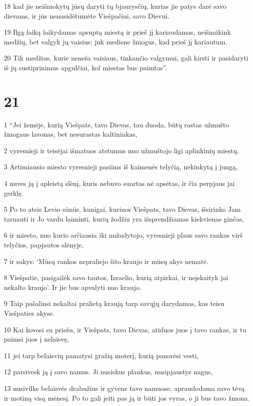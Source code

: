 \par 18 kad jie neišmokytų jūsų daryti tų bjaurysčių, kurias jie patys darė savo dievams, ir jūs nenusidėtumėte Viešpačiui, savo Dievui. 
\par 19 Ilgą laiką laikydamas apsuptą miestą ir prieš jį kariaudamas, neišnaikink medžių, bet valgyk jų vaisius; juk medis­ne žmogus, kad prieš jį kariautum. 
\par 20 Tik medžius, kurie neneša vaisiaus, tinkančio valgymui, gali kirsti ir pasidaryti iš jų sustiprinimus apgulčiai, kol miestas bus paimtas”.



\chapter{21}

\par 1 “Jei žemėje, kurią Viešpats, tavo Dievas, tau duoda, būtų rastas užmušto žmogaus lavonas, bet nesurastas kaltininkas, 
\par 2 vyresnieji ir teisėjai išmatuos atstumus nuo užmuštojo ligi aplinkinių miestų. 
\par 3 Artimiausio miesto vyresnieji pasiims iš kaimenės telyčią, nekinkytą į jungą, 
\par 4 nuves ją į apleistą slėnį, kuris nebuvo suartas nė apsėtas, ir čia perpjaus jai gerklę. 
\par 5 Po to ateis Levio sūnūs, kunigai, kuriuos Viešpats, tavo Dievas, išsirinko Jam tarnauti ir Jo vardu laiminti, kurių žodžiu yra išsprendžiamas kiekvienas ginčas, 
\par 6 ir miesto, nuo kurio arčiausia iki nužudytojo, vyresnieji plaus savo rankas virš telyčios, papjautos slėnyje, 
\par 7 ir sakys: ‘Mūsų rankos nepraliejo šito kraujo ir mūsų akys nematė. 
\par 8 Viešpatie, pasigailėk savo tautos, Izraelio, kurią atpirkai, ir neįskaityk jai nekalto kraujo’. Ir jie bus apvalyti nuo kraujo. 
\par 9 Taip pašalinsi nekaltai pralietą kraują tarp savųjų darydamas, kas teisu Viešpaties akyse. 
\par 10 Kai kovosi su priešu, ir Viešpats, tavo Dievas, atiduos juos į tavo rankas, ir tu paimsi juos į nelaisvę, 
\par 11 jei tarp belaisvių pamatysi gražią moterį, kurią panorėsi vesti, 
\par 12 parsivesk ją į savo namus. Ji nusiskus plaukus, nusipjaustys nagus, 
\par 13 nusivilks belaisvės drabužius ir gyvens tavo namuose, apraudodama savo tėvą ir motiną visą mėnesį. Po to gali įeiti pas ją ir būti jos vyras, o ji bus tavo žmona. 
